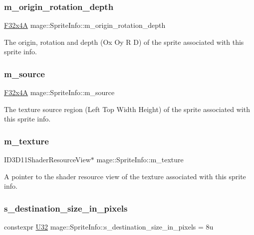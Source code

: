 \subsubsection{\texorpdfstring{m\+\_\+origin\+\_\+rotation\+\_\+depth}{m\_origin\_rotation\_depth}}
{\footnotesize\ttfamily \hyperlink{namespacemage_a0b6ac82244eb3edc5eb66c88a3ddef13}{F32x4A} mage\+::\+Sprite\+Info\+::m\+\_\+origin\+\_\+rotation\+\_\+depth}

The origin, rotation and depth (Ox Oy R D) of the sprite associated with this sprite info. \hypertarget{structmage_1_1_sprite_info_a9b9a0885e4c0927ab0310b810a5d2306}{}\label{structmage_1_1_sprite_info_a9b9a0885e4c0927ab0310b810a5d2306} 
\subsubsection{\texorpdfstring{m\+\_\+source}{m\_source}}
{\footnotesize\ttfamily \hyperlink{namespacemage_a0b6ac82244eb3edc5eb66c88a3ddef13}{F32x4A} mage\+::\+Sprite\+Info\+::m\+\_\+source}

The texture source region (Left Top Width Height) of the sprite associated with this sprite info. \hypertarget{structmage_1_1_sprite_info_aea9963f991406a050bc5759fb05cfd5e}{}\label{structmage_1_1_sprite_info_aea9963f991406a050bc5759fb05cfd5e} 
\subsubsection{\texorpdfstring{m\+\_\+texture}{m\_texture}}
{\footnotesize\ttfamily I\+D3\+D11\+Shader\+Resource\+View$\ast$ mage\+::\+Sprite\+Info\+::m\+\_\+texture}

A pointer to the shader resource view of the texture associated with this sprite info. \hypertarget{structmage_1_1_sprite_info_a202b61bc7afeef1e1cbcc568f020c086}{}\label{structmage_1_1_sprite_info_a202b61bc7afeef1e1cbcc568f020c086} 
\subsubsection{\texorpdfstring{s\+\_\+destination\+\_\+size\+\_\+in\+\_\+pixels}{s\_destination\_size\_in\_pixels}}
{\footnotesize\ttfamily constexpr \hyperlink{namespacemage_a41c104c036fba3756a74e19f793eeaa1}{U32} mage\+::\+Sprite\+Info\+::s\+\_\+destination\+\_\+size\+\_\+in\+\_\+pixels = 8u\hspace{0.3cm}{\ttfamily [static]}}

